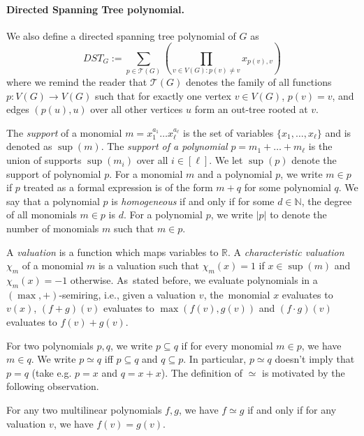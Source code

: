 \paragraph{Directed Spanning Tree polynomial.} We also define a directed spanning tree polynomial of $G$ as
$$
DST_G := \sum_{p \in \mathcal{T}(G)}
\left( \prod_{v \in V(G) : p(v) \neq v} x_{p(v), v} \right)
$$
where we remind the reader that $\mathcal{T}(G)$ denotes the family of all functions $p : V(G) \to V(G)$ such that for exactly one vertex $v \in V(G)$, $p(v) = v$, and edges $(p(u), u)$ over all other vertices $u$ form an out-tree rooted at $v$.
\newline

\noindent
The \emph{support} of a monomial $m = x_1^{a_1} \dots x_\ell^{a_\ell}$ is the set of variables $\{x_1, \dots, x_\ell\}$ and is denoted as $\sup(m)$. The \emph{support of a polynomial} $p = m_1 + \dots + m_\ell$ is the union of supports $\sup(m_i)$ over all $i \in [\ell]$.
We let $\sup(p)$ denote the support of polynomial $p$.
For a monomial $m$ and a polynomial $p$, we write $m \in p$ if $p$ treated as a formal expression is of the form $m + q$ for some polynomial $q$. We say that a polynomial $p$ is \emph{homogeneous} if and only if for some $d \in \mathbb{N}$, the degree of all monomials $m \in p$ is $d$. For a polynomial $p$, we write $|p|$ to denote the number of monomials $m$ such that $m \in p$.

A \emph{valuation} is a function which maps variables to $\mathbb{R}$.
A \emph{characteristic valuation $\chi_m$} of a monomial $m$ is a valuation such that $\chi_m(x) = 1$ if $x \in \sup(m)$ and $\chi_m(x) = -1$ otherwise. As~stated before, we evaluate polynomials in a $(\max, +)$-semiring, i.e., given a valuation $v$, the~monomial $x$ evaluates to $v(x)$, $(f + g)(v)$ evaluates to $\max(f(v), g(v))$ and $(f \cdot g)(v)$ evaluates to $f(v) + g(v)$.

For two polynomials $p, q$, we write $p \subseteq q$ if for every monomial $m \in p$, we have $m \in q$. We write $p \simeq q$ iff $p \subseteq q$ and $q \subseteq p$. In particular, $p \simeq q$ doesn't imply that $p = q$ (take e.g. $p = x$ and $q = x + x$).
The definition of $\simeq$ is motivated by the following observation.

\begin{prop}\label{prop:poly_simeq}
    For any two multilinear polynomials $f, g$, we have $f \simeq g$ if and only if for any valuation $v$, we have $f(v) = g(v)$.
\end{prop}

